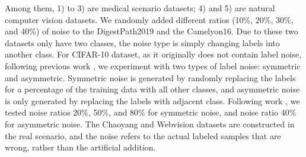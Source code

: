 {Among them, 1) to 3) are medical scenario datasets; 4) and 5) are natural computer vision datasets. We randomly added different ratios (10\%, 20\%, 30\%, and 40\%) of noise to the DigestPath2019 and the Camelyon16. Due to these two datasets only have two classes, the noise type is simply changing labels into another class. For CIFAR-10 dataset, as it originally does not contain label noise, following previous work \cite{chen2019understanding}, we experiment with two types of label noise: symmetric and asymmetric. Symmetric noise is generated by randomly replacing the labels for a percentage of the training data with all other classes, and asymmetric noise is only generated by replacing the labels with adjacent class. Following work \cite{chen2019understanding}, we tested noise ratios 20\%, 50\%, and 80\% for symmetric noise, and noise ratio 40\% for asymmetric noise. The Chaoyang and Webvision datasets are constructed in the real scenario, and the noise refers to the actual labeled samples that are wrong, rather than the artificial addition.}


